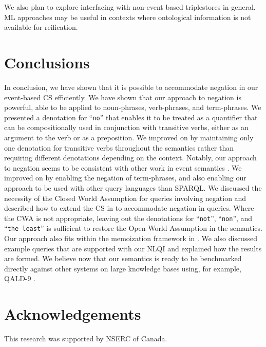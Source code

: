 \documentclass[../main.tex]{subfiles}
\begin{document}
\begin{refsection}
We also plan to explore interfacing with non-event based triplestores in general.  ML approaches may be useful in contexts where ontological information is not available for reification.


\section{Conclusions}
\label{sec:conclusion}

\noindent In conclusion, we have shown that it is possible to accommodate negation in our event-based CS efficiently.  We have shown that our approach to negation is powerful, able to be applied to noun-phrases, verb-phrases, and term-phrases.  We presented a denotation for ``\texttt{no}'' that enables it to be treated as a quantifier that can be compositionally used in conjunction with transitive verbs, either as an argument to the verb or as a preposition.  We improved on \cite{frostboulos2002} by maintaining only one denotation for transitive verbs throughout the semantics rather than requiring different denotations depending on the context.  Notably, our approach to negation seems to be consistent with other work in event semantics \cite{champollion2011}.  We improved on \cite{ferre2013squall} by enabling the negation of term-phrases, and also enabling our approach to be used with other query languages than SPARQL.  We discussed the necessity of the Closed World Assumption for queries involving negation and described how to extend the CS in \cite{frostpeelar2019} to accommodate negation in queries.  Where the CWA is not appropriate, leaving out the denotations for ``\texttt{not}'', ``\texttt{non}'', and ``\texttt{the least}'' is sufficient to restore the Open World Assumption in the semantics.  Our approach also fits within the memoization framework in \cite{frostpeelar2019}. We also discussed example queries that are supported with our NLQI and explained how the results are formed.
We believe now that our semantics is ready to be benchmarked directly against other systems on large knowledge bases using, for example, QALD-9 \cite{qald9}.

\section*{Acknowledgements}

\noindent This research was supported by NSERC of Canada.

%



\end{refsection}
\end{document}
